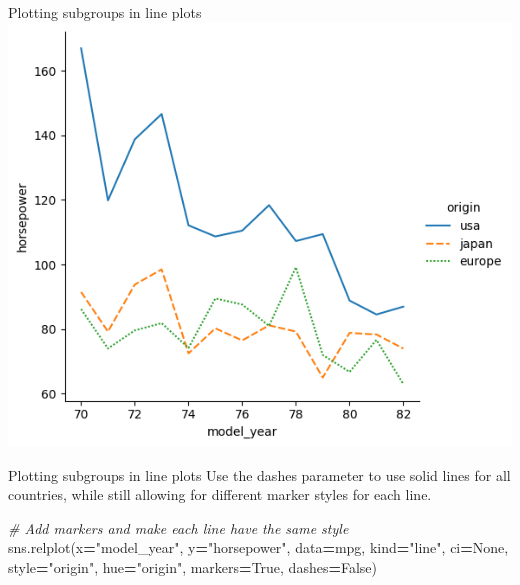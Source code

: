 \documentclass[
  ignorenonframetext,
]{beamer}
\newenvironment{Shaded}{\begin{snugshade}}{\end{snugshade}}
\newcommand{\CommentTok}[1]{\textcolor[rgb]{0.56,0.35,0.01}{\textit{#1}}}
\newcommand{\NormalTok}[1]{#1}
\newcommand{\OperatorTok}[1]{\textcolor[rgb]{0.81,0.36,0.00}{\textbf{#1}}}
\newcommand{\StringTok}[1]{\textcolor[rgb]{0.31,0.60,0.02}{#1}}
\newcommand{\VariableTok}[1]{\textcolor[rgb]{0.00,0.00,0.00}{#1}}
\begin{document}
\begin{frame}{Plotting subgroups in line plots}
\label{plotting-subgroups-in-line-plots-6}
\includegraphics{../images/im275.png}
\end{frame}

\begin{frame}[fragile]{Plotting subgroups in line plots}
\label{plotting-subgroups-in-line-plots-7}
Use the dashes parameter to use solid lines for all countries, while
still allowing for different marker styles for each line.


\begin{Shaded}
\begin{Highlighting}[]
\CommentTok{\# Add markers and make each line have the same style}
\NormalTok{sns.relplot(x}\OperatorTok{=}\StringTok{"model\_year"}\NormalTok{, y}\OperatorTok{=}\StringTok{"horsepower"}\NormalTok{, }
\NormalTok{            data}\OperatorTok{=}\NormalTok{mpg, kind}\OperatorTok{=}\StringTok{"line"}\NormalTok{, }
\NormalTok{            ci}\OperatorTok{=}\VariableTok{None}\NormalTok{, style}\OperatorTok{=}\StringTok{"origin"}\NormalTok{, }
\NormalTok{            hue}\OperatorTok{=}\StringTok{"origin"}\NormalTok{, markers}\OperatorTok{=}\VariableTok{True}\NormalTok{,}
\NormalTok{            dashes}\OperatorTok{=}\VariableTok{False}\NormalTok{)}
\end{Highlighting}
\end{Shaded}
\end{frame}
\end{document}
